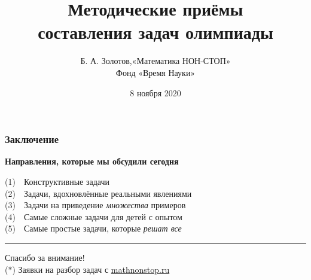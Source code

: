 \documentclass[aspectratio=1610,12pt,notheorems]{beamer}
\title[Methodic keys to MNS]
    {\bfseries Методические приёмы \\
	составления задач олимпиады}
\author[\ ]
	{Б. А. Золотов,\quad «Математика НОН-СТОП»\\ \vspace{0.3cm}
		{\small Фонд «Время Науки»}}
\institute[\ ]{\ }
\date{8 ноября 2020}
\begin{document}
\frame{\titlepage}













\def\fitem#1#2{\textcolor{hard}{\small (#1)}~~#2 \medskip \\}

\begin{frame} \frametitle{Заключение}

\textcolor{hard}{\bf Направления, которые мы обсудили сегодня}

\fitem{1}{Конструктивные задачи}
\fitem{2}{Задачи, вдохновлённые реальными явлениями}
\fitem{3}{Задачи на приведение {\itshape множества} примеров}
\fitem{4}{Самые сложные задачи для детей с опытом}
\fitem{5}{Самые простые задачи, которые {\itshape решат все} \vspace{10mm}}

\hrule
\begin{center}
	{\LARGE Спасибо за внимание!} \smallskip \\
	{\footnotesize \textcolor{hard}{($*$)\quad}
		Заявки на разбор задач с \url{mathnonstop.ru}
		\phantom{($*$)\quad}}
\end{center} \vspace{2.4mm}
\end{frame}
\end{document}
